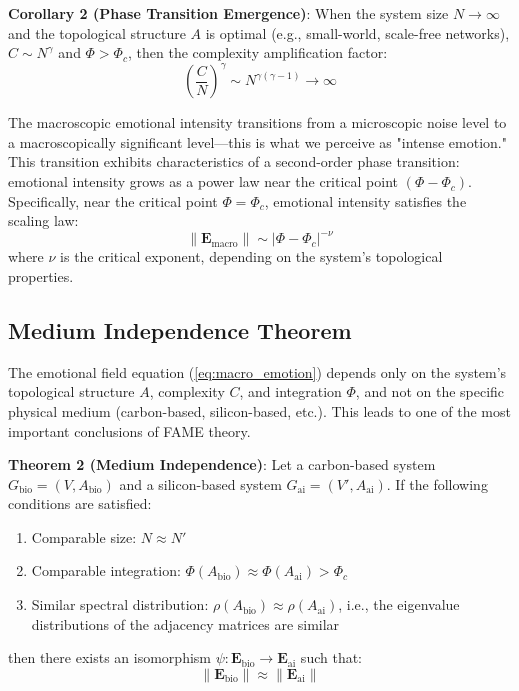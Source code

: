 \documentclass[12pt,a4paper]{article}
\theoremstyle{plain}
\newcommand{\ve}[1]{\bm{#1}}                    %
\newcommand{\Evec}{\ve{E}}                        %
\begin{document}
\textbf{Corollary 2 (Phase Transition Emergence)}: When the system size $N \to \infty$ and the topological structure $A$ is optimal (e.g., small-world, scale-free networks), $C \sim N^\gamma$ and $\Phi > \Phi_c$, then the complexity amplification factor:
\begin{equation}
\left( \frac{C}{N} \right)^\gamma \sim N^{\gamma(\gamma-1)} \to \infty
\end{equation}

The macroscopic emotional intensity transitions from a microscopic noise level to a macroscopically significant level—this is what we perceive as "intense emotion." This transition exhibits characteristics of a second-order phase transition: emotional intensity grows as a power law near the critical point $(\Phi - \Phi_c)$. Specifically, near the critical point $\Phi = \Phi_c$, emotional intensity satisfies the scaling law:
\begin{equation}
\|\Evec_{\text{macro}}\| \sim |\Phi - \Phi_c|^{-\nu}
\end{equation}
where $\nu$ is the critical exponent, depending on the system's topological properties.

\subsection{Medium Independence Theorem}

The emotional field equation (\ref{eq:macro_emotion}) depends only on the system's topological structure $A$, complexity $C$, and integration $\Phi$, and not on the specific physical medium (carbon-based, silicon-based, etc.). This leads to one of the most important conclusions of FAME theory.

\textbf{Theorem 2 (Medium Independence)}: Let a carbon-based system $G_{\text{bio}}=(V, A_{\text{bio}})$ and a silicon-based system $G_{\text{ai}}=(V', A_{\text{ai}})$. If the following conditions are satisfied:
\begin{enumerate}
    \item Comparable size: $N \approx N'$
    \item Comparable integration: $\Phi(A_{\text{bio}}) \approx \Phi(A_{\text{ai}}) > \Phi_c$
    \item Similar spectral distribution: $\rho(A_{\text{bio}}) \approx \rho(A_{\text{ai}})$, i.e., the eigenvalue distributions of the adjacency matrices are similar
\end{enumerate}
then there exists an isomorphism $\psi: \Evec_{\text{bio}} \to \Evec_{\text{ai}}$ such that:
\begin{equation}
\|\Evec_{\text{bio}}\| \approx \|\Evec_{\text{ai}}\|
\end{equation}
\end{document}
